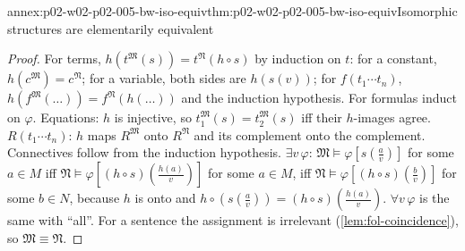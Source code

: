 \begin{annexitem}{annex:p02-w02-p02-005-bw-iso-equiv}{thm:p02-w02-p02-005-bw-iso-equiv}{Isomorphic structures are elementarily equivalent}
\begin{proof}
For terms, \(h(t^{\mathfrak M}(s))=t^{\mathfrak N}(h\circ s)\) by induction
on \(t\): for a constant, \(h(c^{\mathfrak M})=c^{\mathfrak N}\); for a
variable, both sides are \(h(s(v))\); for \(f(t_1\cdots t_n)\),
\(h(f^{\mathfrak M}(\ldots))=f^{\mathfrak N}(h(\ldots))\) and the induction
hypothesis.  For formulas induct on \(\varphi\).  Equations: \(h\) is
injective, so \(t_1^{\mathfrak M}(s)=t_2^{\mathfrak M}(s)\) iff their
\(h\)-images agree.  \(R(t_1\cdots t_n)\): \(h\) maps \(R^{\mathfrak M}\)
onto \(R^{\mathfrak N}\) and its complement onto the complement.
Connectives follow from the induction hypothesis.
\(\exists v\,\varphi\): \(\mathfrak M\models\varphi[s(\tfrac{a}{v})]\) for
some \(a\in M\) iff \(\mathfrak N\models\varphi[(h\circ s)(\tfrac{h(a)}{v})]\)
for some \(a\in M\), iff \(\mathfrak N\models\varphi[(h\circ s)(\tfrac{b}{v})]\)
for some \(b\in N\), because \(h\) is onto and
\(h\circ(s(\tfrac av))=(h\circ s)(\tfrac{h(a)}v)\).  \(\forall v\,\varphi\)
is the same with ``all''.  For a sentence the assignment is irrelevant
(\cref{lem:fol-coincidence}), so \(\mathfrak M\equiv\mathfrak N\).
\end{proof}
\end{annexitem}

